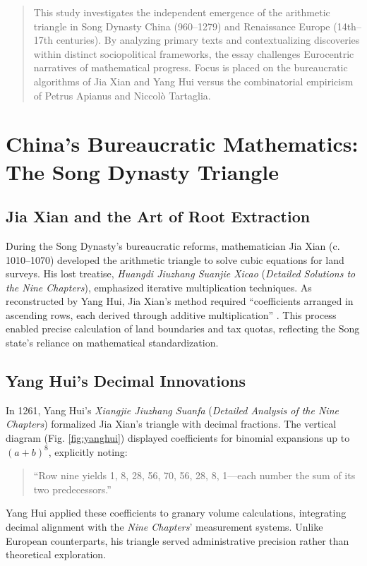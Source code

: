 \documentclass{article}
\begin{document}
\begin{abstract}
    This study investigates the independent emergence of the arithmetic triangle in Song Dynasty China (960--1279) and Renaissance Europe (14th--17th centuries). By analyzing primary texts and contextualizing discoveries within distinct sociopolitical frameworks, the essay challenges Eurocentric narratives of mathematical progress. Focus is placed on the bureaucratic algorithms of Jia Xian and Yang Hui versus the combinatorial empiricism of Petrus Apianus and Niccolò Tartaglia.
\end{abstract}

\section{China’s Bureaucratic Mathematics: The Song Dynasty Triangle}

\subsection{Jia Xian and the Art of Root Extraction}
During the Song Dynasty’s bureaucratic reforms, mathematician Jia Xian (c. 1010--1070) developed the arithmetic triangle to solve cubic equations for land surveys. His lost treatise, \textit{Huangdi Jiuzhang Suanjie Xicao} (\textit{Detailed Solutions to the Nine Chapters}), emphasized iterative multiplication techniques. As reconstructed by Yang Hui, Jia Xian’s method required “coefficients arranged in ascending rows, each derived through additive multiplication” \cite{lam1994}. This process enabled precise calculation of land boundaries and tax quotas, reflecting the Song state’s reliance on mathematical standardization.

\subsection{Yang Hui’s Decimal Innovations}
In 1261, Yang Hui’s \textit{Xiangjie Jiuzhang Suanfa} (\textit{Detailed Analysis of the Nine Chapters}) formalized Jia Xian’s triangle with decimal fractions. The vertical diagram (Fig. \ref{fig:yanghui}) displayed coefficients for binomial expansions up to $(a + b)^8$, explicitly noting: 
\begin{quote}
    “Row nine yields 1, 8, 28, 56, 70, 56, 28, 8, 1—each number the sum of its two predecessors.”  
\end{quote}
Yang Hui applied these coefficients to granary volume calculations, integrating decimal alignment with the \textit{Nine Chapters}’ measurement systems. Unlike European counterparts, his triangle served administrative precision rather than theoretical exploration.
\end{document}
